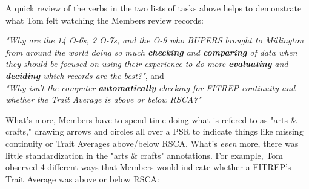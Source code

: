 \documentclass[UTF8]{article}
\begin{document}
A quick review of the verbs in the two lists of tasks above helps to demonstrate
what Tom felt watching the Members review records:\\

\begin{adjustwidth}{35pt}{35pt}

\indent \indent \textit{"Why are the 14 O-6s, 2 O-7s, and the O-9 who BUPERS brought
to Millington from around the world doing so much \textbf{checking} and
\textbf{comparing} of data when they should be focused on using their experience to
do more \textbf{evaluating} and \textbf{deciding} which records are the best?"}, and
\\

\indent \textit{"Why isn't the computer \textbf{automatically} checking for FITREP
continuity and whether the Trait Average is above or below RSCA?"}\\

\end{adjustwidth}

What's more, Members have to spend time doing what is refered to as
"arts \& crafts," drawing arrows and circles all over a PSR to indicate things like
missing continuity or Trait Averages above/below RSCA. What's \textit{even} more,
there was little standardization in the "arts \& crafts" annotations. For example, Tom
observed 4 different ways that Members would indicate whether a FITREP's Trait
Average was above or below RSCA:
\end{document}
